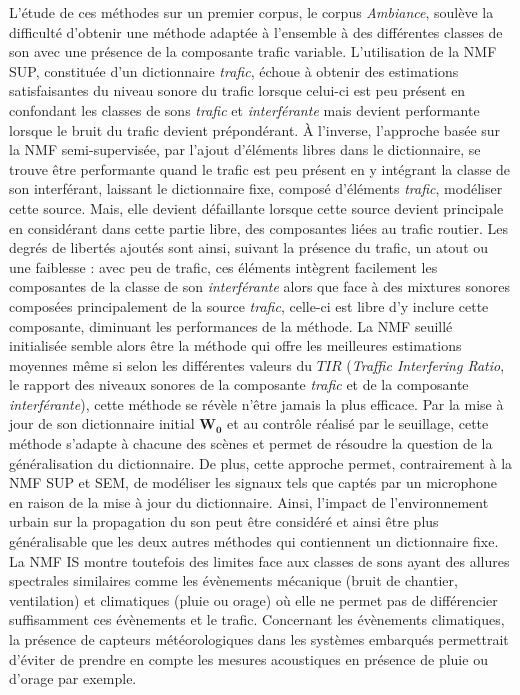 L'étude de ces méthodes sur un premier corpus, le corpus \textit{Ambiance}, soulève la difficulté d'obtenir une méthode adaptée à l'ensemble à des différentes classes de son avec une présence de la composante trafic variable. 
L'utilisation de la NMF SUP, constituée d'un dictionnaire \textit{trafic}, échoue à obtenir des estimations satisfaisantes du niveau sonore du trafic lorsque celui-ci est peu présent en confondant les classes de sons \textit{trafic} et \textit{interférante} mais devient performante lorsque le bruit du trafic devient prépondérant. 
À l'inverse, l'approche basée sur la NMF semi-supervisée, par l'ajout d'éléments libres dans le dictionnaire, se trouve être performante quand le trafic est peu présent en y intégrant la classe de son interférant, laissant le dictionnaire fixe, composé d'éléments \textit{trafic}, modéliser cette source. 
Mais, elle devient défaillante lorsque cette source devient principale en considérant dans cette partie libre, des composantes liées au trafic routier. Les degrés de libertés ajoutés sont ainsi, suivant la présence du trafic, un atout ou une faiblesse : avec peu de trafic, ces éléments intègrent facilement les composantes de la classe de son \textit{interférante} alors que face à des mixtures sonores composées principalement de la source \textit{trafic}, celle-ci est libre d'y inclure cette composante, diminuant les performances de la méthode.
La NMF seuillé initialisée semble alors être la méthode qui offre les meilleures estimations moyennes même si selon les différentes valeurs du $TIR$ (\textit{Traffic Interfering Ratio}, le rapport des niveaux sonores de la composante \textit{trafic} et de la composante \textit{interférante}), cette méthode se révèle n'être jamais la plus efficace. Par la mise à jour de son dictionnaire initial $\mathbf{W_0}$ et au contrôle réalisé par le seuillage, cette méthode s'adapte à chacune des scènes et permet de résoudre la question de la généralisation du dictionnaire. De plus, cette approche permet, contrairement à la NMF SUP et SEM, de modéliser les signaux tels que captés par un microphone en raison de la mise à jour du dictionnaire. Ainsi, l'impact de l'environnement urbain sur la propagation du son peut être considéré et ainsi être plus généralisable que les deux autres méthodes qui contiennent un dictionnaire fixe. La NMF IS montre toutefois des limites face aux classes de sons ayant des allures spectrales similaires comme les évènements mécanique (bruit de chantier, ventilation) et climatiques (pluie ou orage) où elle ne permet pas de différencier suffisamment ces évènements et le trafic. Concernant les évènements climatiques, la présence de capteurs météorologiques dans les systèmes embarqués permettrait d'éviter de prendre en compte les mesures acoustiques en présence de pluie ou d'orage par exemple.


